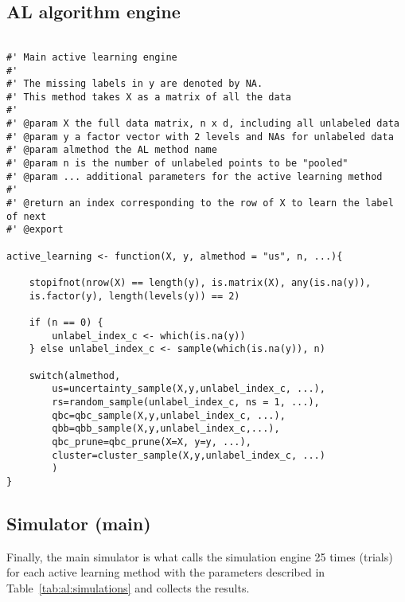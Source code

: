 \subsection{AL algorithm engine}
\label{sec:appendicies:al:simulations:alengine}
{
\begin{lstlisting}

#' Main active learning engine
#'
#' The missing labels in y are denoted by NA.
#' This method takes X as a matrix of all the data
#'
#' @param X the full data matrix, n x d, including all unlabeled data
#' @param y a factor vector with 2 levels and NAs for unlabeled data
#' @param almethod the AL method name
#' @param n is the number of unlabeled points to be "pooled"
#' @param ... additional parameters for the active learning method
#'
#' @return an index corresponding to the row of X to learn the label of next
#' @export

active_learning <- function(X, y, almethod = "us", n, ...){

	stopifnot(nrow(X) == length(y), is.matrix(X), any(is.na(y)),
	is.factor(y), length(levels(y)) == 2)
	
	if (n == 0) {
		unlabel_index_c <- which(is.na(y))
	} else unlabel_index_c <- sample(which(is.na(y)), n)
	
	switch(almethod,
		us=uncertainty_sample(X,y,unlabel_index_c, ...),
		rs=random_sample(unlabel_index_c, ns = 1, ...),
		qbc=qbc_sample(X,y,unlabel_index_c, ...),
		qbb=qbb_sample(X,y,unlabel_index_c,...),
		qbc_prune=qbc_prune(X=X, y=y, ...),
		cluster=cluster_sample(X,y,unlabel_index_c, ...)
		)
}
\end{lstlisting}
}

\subsection{Simulator (main)}
\label{sec:appendicies:al:simulations:results}

Finally, the main simulator is what calls the simulation engine 25 times 
(trials) for each active learning method with the parameters described in 
Table~\ref{tab:al:simulations} and collects the results.

